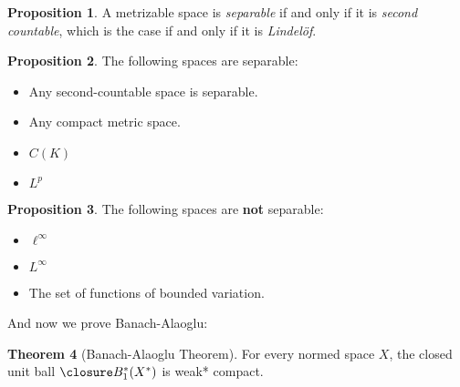\documentclass[a5paper]{article}
\theoremstyle{definition}%
\newtheorem{theorem}{Theorem}
\newtheorem{proposition}[theorem]{Proposition}
\numberwithin{exercise}{section}
\theoremstyle{remark}%
\begin{document}
\begin{proposition}
A metrizable space is \textit{separable} if and only if it is \textit{second countable}, which is the case if and only if it is \textit{Lindel\"of}.
\end{proposition}

\begin{highlight}
\begin{proposition}
The following spaces are separable:
	\begin{itemize}
	\item Any second-countable space is separable.
	\item Any compact metric space.
	\item $C(K)$
	\item $L^p$
	\end{itemize}
\end{proposition}
\end{highlight}

\begin{highlight}
\begin{proposition}
The following spaces are \textbf{not} separable:
	\begin{itemize}
	\item $\ell^\infty$
	\item $L^\infty$
	\item The set of functions of bounded variation.
	\end{itemize}
\end{proposition}
\end{highlight}

And now we prove Banach-Alaoglu:

\pagebreak

\setcounter{theorem}{7}
\begin{highlight}
\begin{theorem}[Banach-Alaoglu Theorem]
For every normed space $X$, the closed unit ball $\B(X^*)$ is weak* compact. 
\end{theorem}
\end{highlight}
\setcounter{theorem}{13}
\end{document}
